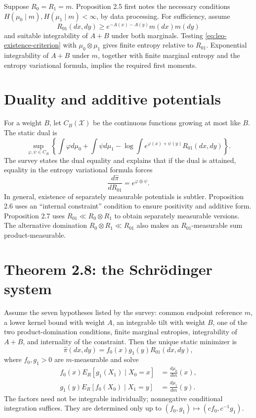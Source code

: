 Suppose \(R_0=R_1=m\).  Proposition 2.5 first notes the necessary conditions
\(H(\mu_0\mid m),H(\mu_1\mid m)<\infty\), by data processing.  For sufficiency, assume
\[
 R_{01}(dx,dy)\ge e^{-A(x)-A(y)}m(dx)m(dy)
\]
and suitable integrability of \(A+B\) under both marginals.  Testing
\eqref{eq:leo-existence-criterion} with \(\mu_0\otimes\mu_1\) gives finite entropy relative to
\(R_{01}\).  Exponential integrability of \(A+B\) under \(m\), together with finite marginal
entropy and the entropy variational formula, implies the required first moments.

\section{Duality and additive potentials}
For a weight \(B\), let \(C_B(\mathcal X)\) be the continuous functions growing at most like \(B\).
The static dual is
\begin{equation}\label{eq:leo-dual}
 \sup_{\varphi,\psi\in C_B}
 \left\{
  \int\varphi d\mu_0+\int\psi d\mu_1
  -\log\int e^{\varphi(x)+\psi(y)}R_{01}(dx,dy)
 \right\}.
\end{equation}
The survey states the dual equality and explains that if the dual is attained, equality in the
entropy variational formula forces
\[
 \frac{d\widehat\pi}{dR_{01}}=e^{\varphi\oplus\psi}.
\]
In general, existence of separately measurable potentials is subtler.  Proposition 2.6 uses an
``internal constraint'' condition to ensure positivity and additive form.  Proposition 2.7 uses
\(R_{01}\ll R_0\otimes R_1\) to obtain separately measurable versions.  The alternative domination
\(R_0\otimes R_1\ll R_{01}\) also makes an \(R_{01}\)-measurable sum product-measurable.

\section{Theorem 2.8: the Schr\"odinger system}
Assume the seven hypotheses listed by the survey: common endpoint reference \(m\), a lower kernel
bound with weight \(A\), an integrable tilt with weight \(B\), one of the two product-domination
conditions, finite marginal entropies, integrability of \(A+B\), and internality of the constraint.
Then the unique static minimizer is
\begin{equation}\label{eq:leo-static-factor}
 \widehat\pi(dx,dy)=f_0(x)g_1(y)R_{01}(dx,dy),
\end{equation}
where \(f_0,g_1>0\) are \(m\)-measurable and solve
\begin{align}
 f_0(x)E_R[g_1(X_1)\mid X_0=x]&=\frac{d\mu_0}{dm}(x),\label{eq:leo-system1}\\
 g_1(y)E_R[f_0(X_0)\mid X_1=y]&=\frac{d\mu_1}{dm}(y).\label{eq:leo-system2}
\end{align}
The factors need not be integrable individually; nonnegative conditional integration suffices.  They
are determined only up to \((f_0,g_1)\mapsto(cf_0,c^{-1}g_1)\).

